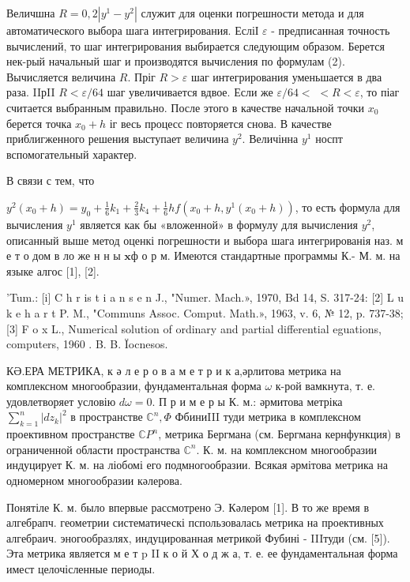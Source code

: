 \documentclass[10pt]{article}
\begin{document}
Величшна $R=0,2\left|y^{1}-y^{2}\right|$ служит для оценки погрешности метода и для автоматического выбора шага интегрирования. ЕсліІ $\varepsilon$ - предписанная точность вычислений, то шаг интегрирования выбирается следующим образом. Берется нек-рый начальный шаг и производятся вычисления по формулам (2). Вычисляется величина $R$. Пріг $R>\varepsilon$ шаг интегрирования уменьшается в два раза. IIрII $R<\varepsilon / 64$ шаг увеличивается вдвое. Если же $\varepsilon / 64<$ $<R<\varepsilon$, то піаг считается выбранным правильно. После этого в качестве начальной точки $x_{0}$ берется точка $x_{0}+h$ іг весь процесс повторяется снова. В качестве приблигженного решения выступает величина $y^{2}$. Величінна $y^{1}$ носпт вспомогательный характер.



В связи с тем, что



$y^{2}\left(x_{0}+h\right)=y_{0}+\frac{1}{6} k_{1}+\frac{2}{3} k_{4}+\frac{1}{6} h f\left(x_{0}+h, y^{1}\left(x_{0}+h\right)\right)$, то есть формула для вычисления $y^{1}$ является как бы «вложенной» в формулу для вычисления $y^{2}$, описанный выше метод оценкі погрешности и выбора шага интегрированія наз. м е т о дом в ло же н н ы $\mathbf{x} ф$ о р м. Имеются стандартные программы К.- М. м. на языке алгос [1], [2].



'Tum.: [i] C h r is t i a n s e n J., "Numer. Mach.», 1970, Bd 14, S. 317-24: [2] L u k e h a r t P. M., "Communs Assoc. Comput. Math.», 1963, v. 6, № 12, p. 737-38; [3] F o x L., Numerical solution of ordinary and partial differential eguations, computers, 1960 . B. B. Ïocnesos.



КӘ.ЕРА МЕТРИКА, к ә л е р о в а м е т р и к а,әрлитова метрика на комплексном многообразии, фундаментальная форма $\omega$ к-рой вамкнута, т. е. удовлетворяет условію $d \omega=0$. П р и м е р ы К. м.: әрмитова метріка $\sum_{k=1}^{n}\left|d z_{k}\right|^{2}$ в пространстве $\mathbb{C}^{n}, \Phi$ ФбиниIII туди метрика в комплексном проективном пространстве $\mathbb{C} P^{n}$, метрика Бергмана (см. Бергмана кернфункция) в ограниченной области пространства $\mathbb{C}^{n}$. К. м. на комплексном многообразии индуцирует К. м. на ліобомі его подмногообразии. Всякая әрмітова метрика на одномерном многообразии кәлерова.



Понятіле К. м. было впервые рассмотрено Э. Кәлером [1]. В то же время в алгебрапч. геометрии систематическі пспользовалась метрика на проективных алгебраич. эногообразлях, индуцированная метрикой Фубині - IIIтуди (см. [5]). Эта метрика является м е т p II к о й Х о д ж а, т. е. ее фундаментальная форма имест целочісленные периоды.
\end{document}

